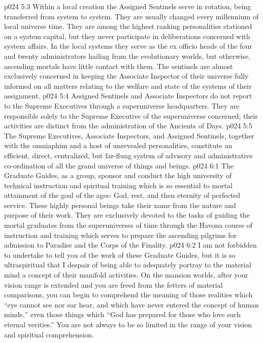 \vs p024 5:3 Within a local creation the Assigned Sentinels serve in rotation, being transferred from system to system. They are usually changed every millennium of local universe time. They are among the highest ranking personalities stationed on a system capital, but they never participate in deliberations concerned with system affairs. In the local systems they serve as the ex officio heads of the four and twenty administrators hailing from the evolutionary worlds, but otherwise, ascending mortals have little contact with them. The sentinels are almost exclusively concerned in keeping the Associate Inspector of their universe fully informed on all matters relating to the welfare and state of the systems of their assignment.
\vs p024 5:4 Assigned Sentinels and Associate Inspectors do not report to the Supreme Executives through a superuniverse headquarters. They are responsible solely to the Supreme Executive of the superuniverse concerned; their activities are distinct from the administration of the Ancients of Days.
\vs p024 5:5 \pc The Supreme Executives, Associate Inspectors, and Assigned Sentinels, together with the omniaphim and a host of unrevealed personalities, constitute an efficient, direct, centralized, but far\hyp{}flung system of advisory and administrative co\hyp{}ordination of all the grand universe of things and beings.
\vs p024 6:1 The Graduate Guides, as a group, sponsor and conduct the high university of technical instruction and spiritual training which is so essential to mortal attainment of the goal of the ages: God, rest, and then eternity of perfected service. These highly personal beings take their name from the nature and purpose of their work. They are exclusively devoted to the tasks of guiding the mortal graduates from the superuniverses of time through the Havona course of instruction and training which serves to prepare the ascending pilgrims for admission to Paradise and the Corps of the Finality.
\vs p024 6:2 I am not forbidden to undertake to tell you of the work of these Graduate Guides, but it is so ultraspiritual that I despair of being able to adequately portray to the material mind a concept of their manifold activities. On the mansion worlds, after your vision range is extended and you are freed from the fetters of material comparisons, you can begin to comprehend the meaning of those realities which “eye cannot see nor ear hear, and which have never entered the concept of human minds,” even those things which “God has prepared for those who love such eternal verities.” You are not always to be so limited in the range of your vision and spiritual comprehension.
